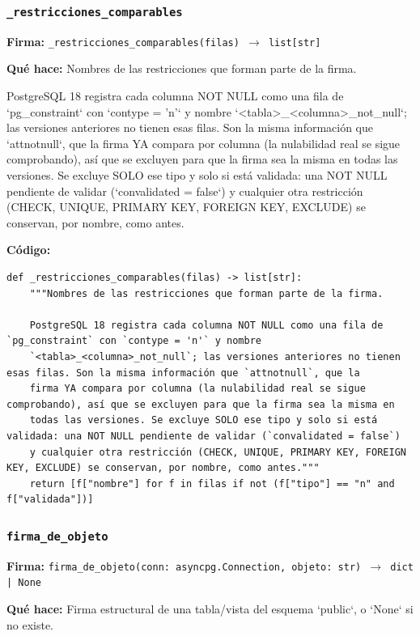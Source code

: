 \documentclass[11pt,a4paper]{article}
\begin{document}
\subsubsection*{\texttt{\_restricciones\_comparables}}
\textbf{Firma:} \texttt{\_restricciones\_comparables(filas) $\rightarrow$ list[str]}

\textbf{Qué hace:} Nombres de las restricciones que forman parte de la firma.

PostgreSQL 18 registra cada columna NOT NULL como una fila de `pg\_constraint` con `contype = 'n'` y nombre
`<tabla>\_<columna>\_not\_null`; las versiones anteriores no tienen esas filas. Son la misma información que `attnotnull`, que la
firma YA compara por columna (la nulabilidad real se sigue comprobando), así que se excluyen para que la firma sea la misma en
todas las versiones. Se excluye SOLO ese tipo y solo si está validada: una NOT NULL pendiente de validar (`convalidated = false`)
y cualquier otra restricción (CHECK, UNIQUE, PRIMARY KEY, FOREIGN KEY, EXCLUDE) se conservan, por nombre, como antes.

\textbf{Código:}
\begin{lstlisting}
def _restricciones_comparables(filas) -> list[str]:
    """Nombres de las restricciones que forman parte de la firma.

    PostgreSQL 18 registra cada columna NOT NULL como una fila de `pg_constraint` con `contype = 'n'` y nombre
    `<tabla>_<columna>_not_null`; las versiones anteriores no tienen esas filas. Son la misma información que `attnotnull`, que la
    firma YA compara por columna (la nulabilidad real se sigue comprobando), así que se excluyen para que la firma sea la misma en
    todas las versiones. Se excluye SOLO ese tipo y solo si está validada: una NOT NULL pendiente de validar (`convalidated = false`)
    y cualquier otra restricción (CHECK, UNIQUE, PRIMARY KEY, FOREIGN KEY, EXCLUDE) se conservan, por nombre, como antes."""
    return [f["nombre"] for f in filas if not (f["tipo"] == "n" and f["validada"])]
\end{lstlisting}

\subsubsection*{\texttt{firma\_de\_objeto}}
\textbf{Firma:} \texttt{firma\_de\_objeto(conn: asyncpg.Connection, objeto: str) $\rightarrow$ dict | None}

\textbf{Qué hace:} Firma estructural de una tabla/vista del esquema `public`, o `None` si no existe.
\end{document}

